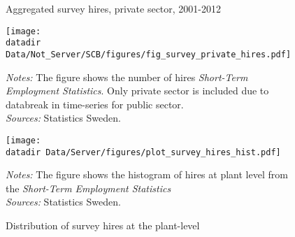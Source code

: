 
	
\begin{figure}[t]
\centering
\caption{Aggregated survey hires, private sector, 2001-2012}
\label{fig:hires_survey_timeserie}
\texttt{[image: \\datadir Data/Not\_Server/SCB/figures/fig\_survey\_private\_hires.pdf]}
\begin{flushleft}
\footnotesize{\emph{Notes:} The figure shows the number of hires \emph{Short-Term Employment Statistics}. Only private sector is included due to databreak in time-series for public sector.} \\
\footnotesize{\emph{Sources:} Statistics Sweden.}
\end{flushleft}
\vspace{2mm}
\centering
\caption{Distribution of survey hires at the plant-level}
\label{fig:hires_survey_hist}
\texttt{[image: \\datadir Data/Server/figures/plot\_survey\_hires\_hist.pdf]}
\begin{flushleft}
\footnotesize{\emph{Notes:} The figure shows the histogram of hires at plant level from the \emph{Short-Term Employment Statistics} } \\
\footnotesize{\emph{Sources:} Statistics Sweden.}
\end{flushleft}
\end{figure}

